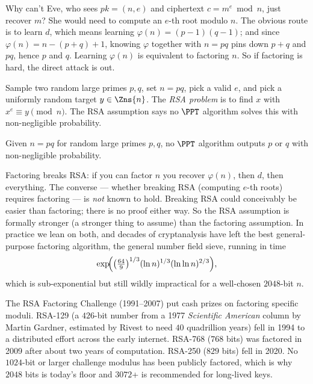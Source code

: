 Why can't Eve, who sees $pk=(n,e)$ and ciphertext $c=m^e\bmod n$, just recover $m$? She would need to compute an $e$-th root modulo $n$. The obvious route is to learn $d$, which means learning $\varphi(n)=(p-1)(q-1)$; and since $\varphi(n) = n - (p+q) + 1$, knowing $\varphi$ together with $n=pq$ pins down $p+q$ and $pq$, hence $p$ and $q$. Learning $\varphi(n)$ is equivalent to factoring $n$. So if factoring is hard, the direct attack is out.

\begin{definition}
\label{ch19:rsa-assumption}
Sample two random large primes $p,q$, set $n=pq$, pick a valid $e$, and pick a uniformly random target $y\in\Zns{n}$. The \emph{RSA problem} is to find $x$ with $x^e\equiv y\pmod n$. The RSA assumption says no $\PPT$ algorithm solves this with non-negligible probability.
\end{definition}

\begin{definition}
\label{ch19:factoring-assumption}
Given $n=pq$ for random large primes $p,q$, no $\PPT$ algorithm outputs $p$ or $q$ with non-negligible probability.
\end{definition}

Factoring breaks RSA: if you can factor $n$ you recover $\varphi(n)$, then $d$, then everything. The converse --- whether breaking RSA (computing $e$-th roots) requires factoring --- is \emph{not} known to hold. Breaking RSA could conceivably be easier than factoring; there is no proof either way. So the RSA assumption is formally stronger (a stronger thing to assume) than the factoring assumption. In practice we lean on both, and decades of cryptanalysis have left the best general-purpose factoring algorithm, the general number field sieve, running in time
\[
  \exp\!\Bigl( \bigl(\tfrac{64}{9}\bigr)^{1/3} (\ln n)^{1/3}(\ln\ln n)^{2/3} \Bigr),
\]
which is sub-exponential but still wildly impractical for a well-chosen $2048$-bit $n$.

\begin{historybox}
The RSA Factoring Challenge (1991--2007) put cash prizes on factoring specific moduli. RSA-129 (a $426$-bit number from a 1977 \emph{Scientific American} column by Martin Gardner, estimated by Rivest to need $40$ quadrillion years) fell in 1994 to a distributed effort across the early internet. RSA-768 ($768$ bits) was factored in 2009 after about two years of computation. RSA-250 ($829$ bits) fell in 2020. No $1024$-bit or larger challenge modulus has been publicly factored, which is why $2048$ bits is today's floor and $3072$+ is recommended for long-lived keys.
\end{historybox}

